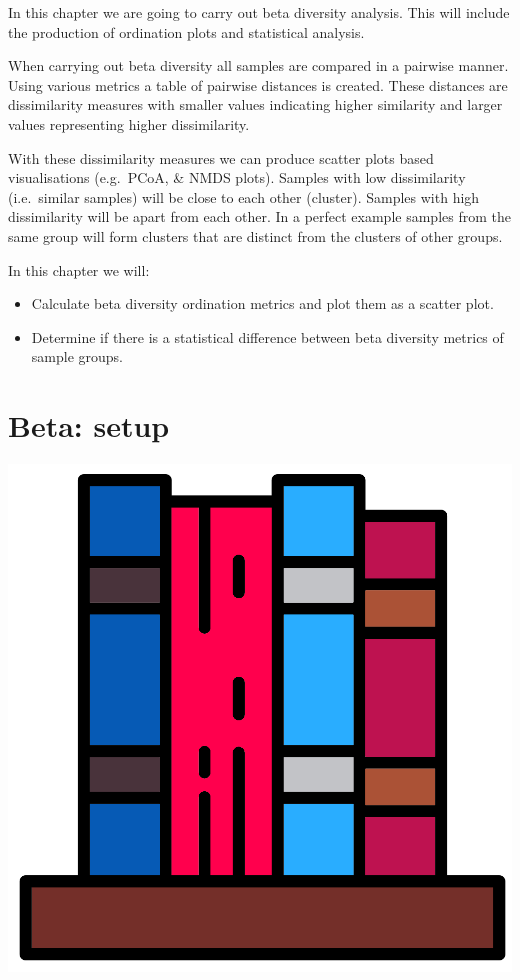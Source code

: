 \documentclass[
]{book}
\providecommand{\tightlist}{%
  \setlength{\itemsep}{0pt}\setlength{\parskip}{0pt}}
\begin{document}
In this chapter we are going to carry out beta diversity analysis.
This will include the production of ordination plots and statistical analysis.

When carrying out beta diversity all samples are compared in a pairwise manner.
Using various metrics a table of pairwise distances is created.
These distances are dissimilarity measures with smaller values indicating higher similarity and larger values representing higher dissimilarity.

With these dissimilarity measures we can produce scatter plots based visualisations (e.g.~PCoA, \& NMDS plots).
Samples with low dissimilarity (i.e.~similar samples) will be close to each other (cluster).
Samples with high dissimilarity will be apart from each other.
In a perfect example samples from the same group will form clusters that are distinct from the clusters of other groups.

In this chapter we will:

\begin{itemize}
\tightlist
\item
  Calculate beta diversity ordination metrics and plot them as a scatter plot.
\item
  Determine if there is a statistical difference between beta diversity metrics of sample groups.
\end{itemize}

\hypertarget{beta-setup}{%
\section{Beta: setup}\label{beta-setup}}

\includegraphics{figures/books.png}
\end{document}
